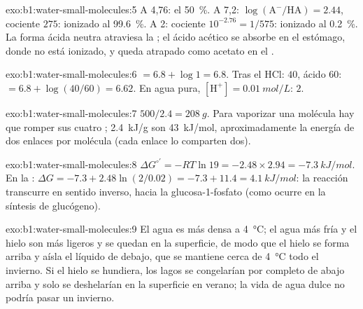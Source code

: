 \begin{solution}{exo:b1:water-small-molecules:5}
A  4,76: el \qty{50}{\%}. A 7,2: $\log(\mathrm{A^-}/\mathrm{HA}) =
2.44$, cociente $275$: ionizado al \qty{99.6}{\%}. A  2: cociente
$10^{-2.76} =
1/575$: ionizado al \qty{0.2}{\%}. La forma ácida neutra
atraviesa la ; el ácido acético se absorbe en el estómago,
donde no está ionizado, y queda atrapado como acetato en el .
\end{solution}

\begin{solution}{exo:b1:water-small-molecules:6}
 $= 6.8 + \log 1 = 6.8$. Tras el HCl:  $40$, ácido $60$:  $= 6.8 +
\log(40/60) = 6.62$. En agua pura, $[\mathrm{H^+}] = \qty{0.01}{mol/L}$:
 $2$.
\end{solution}

\begin{solution}{exo:b1:water-small-molecules:7}
$500/2.4 = \qty{208}{g}$. Para vaporizar una molécula hay que romper sus
cuatro ; \qty{2.4}{kJ/g} son \qty{43}{kJ/mol},
aproximadamente la energía de dos enlaces por molécula (cada enlace lo
comparten dos).
\end{solution}

\begin{solution}{exo:b1:water-small-molecules:8}
$\Delta G^{\circ\prime} = -RT\ln 19 = -2.48\times 2.94 =
\qty{-7.3}{kJ/mol}$. En la : $\Delta G = -7.3 + 2.48\ln(2/0.02) =
-7.3 + 11.4 = \qty{+4.1}{kJ/mol}$: la reacción transcurre en sentido
inverso, hacia la glucosa-1-fosfato (como ocurre en la síntesis de
glucógeno).
\end{solution}

\begin{solution}{exo:b1:water-small-molecules:9}
El agua es más densa a \qty{4}{\celsius}; el agua más fría y el hielo son
más ligeros y se quedan en la superficie, de modo que el hielo se forma
arriba y aísla el líquido de debajo, que se mantiene cerca de
\qty{4}{\celsius} todo el invierno. Si el hielo se hundiera, los lagos se
congelarían por completo de abajo arriba y solo se deshelarían en la
superficie en verano; la vida de agua dulce no podría pasar un invierno.
\end{solution}

